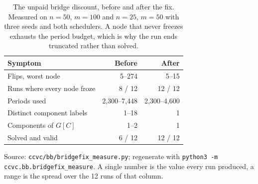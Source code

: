 \begin{table}[tb]
\centering
\caption{The unpaid bridge discount, before and after the fix. Measured on $n=50$, $m=100$ and $n=25$, $m=50$ with three seeds and both schedulers. A node that never freezes exhausts the period budget, which is why the run ends truncated rather than solved.}
\label{tab:bridgefix}
\begin{tabular}{lrr}
\toprule
Symptom & Before & After \\
\midrule
Flips, worst node & 5--274 & 5--15 \\
Runs where every node froze & 8 / 12 & 12 / 12 \\
Periods used & 2,300--7,448 & 2,300--4,600 \\
Distinct component labels & 1--18 & 1 \\
Components of $G[C]$ & 1--2 & 1 \\
Solved and valid & 6 / 12 & 12 / 12 \\
\bottomrule
\end{tabular}
\begin{flushleft}\footnotesize
Source: \texttt{ccvc/bb/bridgefix\_measure.py}; regenerate with \texttt{python3 -m ccvc.bb.bridgefix\_measure}. A single number is the value every run produced, a range is the spread over the 12 runs of that column.
\end{flushleft}
\end{table}
